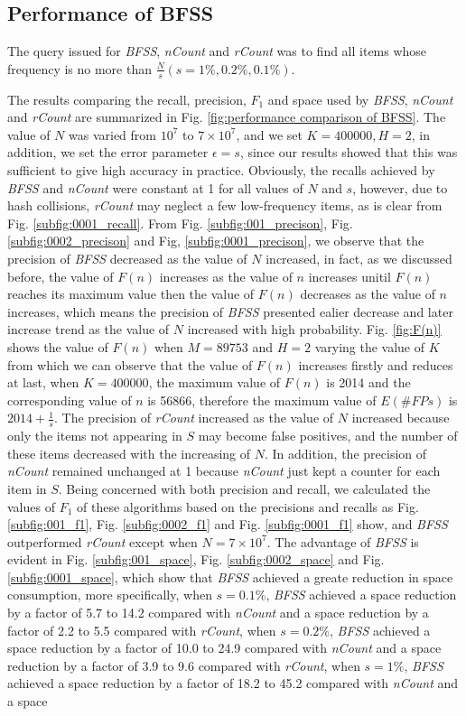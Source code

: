 \documentclass[conference]{IEEEtran}
\begin{document}
\subsection{Performance of BFSS}
The query issued for \emph{BFSS}, \emph{nCount} and \emph{rCount} was to find all items whose frequency is no more than $\frac{N}{s}(s=1\%,0.2\%,0.1\%)$.\par
The results comparing the recall, precision, $F_1$ and space used by \emph{BFSS}, \emph{nCount} and \emph{rCount} are summarized in Fig. \ref{fig:performance comparison of BFSS}. The value of $N$ was varied from $10^7$ to $7\times 10^7$, and we set $K=400000,H=2$, in addition, we set the error parameter $\epsilon=s$, since our results showed that this was sufficient to give high accuracy in practice. Obviously, the recalls achieved by \emph{BFSS} and \emph{nCount} were constant at 1 for all values of $N$ and $s$, however, due to hash collisions, \emph{rCount} may neglect a few low-frequency items, as is clear from Fig. \ref{subfig:0001_recall}. From Fig. \ref{subfig:001_precison}, Fig. \ref{subfig:0002_precison} and Fig, \ref{subfig:0001_precison}, we observe that the precision of \emph{BFSS} decreased as the value of $N$ increased, in fact, as we discussed before, the value of $F(n)$ increases as the value of $n$ increases unitil $F(n)$ reaches its maximum value then the value of $F(n)$ decreases as the value of $n$ increases, which means the precision of \emph{BFSS} presented ealier decrease and later increase trend as the value of $N$ increased with high probability. Fig. \ref{fig:F(n)} shows the value of $F(n)$ when $M=89753$ and $H=2$ varying the value of $K$ from which we can observe that the value of $F(n)$ increases firstly and reduces at last, when $K=400000$, the maximum value of $F(n)$ is 2014 and the corresponding value of $n$ is 56866, therefore the maximum value of $E(\#FPs)$ is $2014+\frac{1}{s}$. The precision of \emph{rCount} increased as the value of $N$ increased because only the items not appearing in $S$ may become false positives, and the number of these items decreased with the increasing of $N$. In addition, the precision of \emph{nCount} remained unchanged at 1 because \emph{nCount} just kept a counter for each item in $S$. Being concerned with both precision and recall, we calculated the values of $F_1$ of these algorithms based on the precisions and recalls as Fig. \ref{subfig:001_f1}, Fig. \ref{subfig:0002_f1} and Fig. \ref{subfig:0001_f1} show, and \emph{BFSS} outperformed \emph{rCount} except when $N=7\times 10^7$. The advantage of \emph{BFSS} is evident in Fig. \ref{subfig:001_space}, Fig. \ref{subfig:0002_space} and Fig. \ref{subfig:0001_space}, which show that \emph{BFSS} achieved a greate reduction in space consumption, more specifically, when $s=0.1\%$, \emph{BFSS} achieved a space reduction by a factor of 5.7 to 14.2 compared with \emph{nCount} and a space reduction by a factor of 2.2 to 5.5 compared with \emph{rCount}, when $s=0.2\%$, \emph{BFSS} achieved a space reduction by a factor of 10.0 to 24.9 compared with \emph{nCount} and a space reduction by a factor of 3.9 to 9.6 compared with \emph{rCount}, when $s=1\%$, \emph{BFSS} achieved a space reduction by a factor of 18.2 to 45.2 compared with \emph{nCount} and a space 
\end{document}
